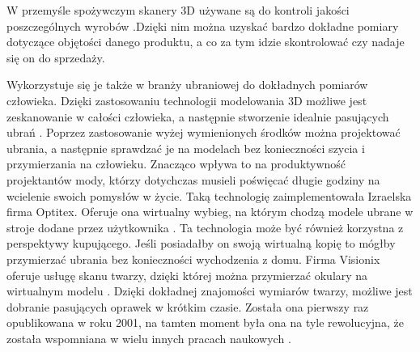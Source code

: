 \documentclass{pginz}
\begin{document}
W przemyśle spożywczym skanery 3D używane są do kontroli jakości poszczególnych wyrobów \cite{anders2012zastosowanie}.Dzięki nim można uzyskać bardzo dokładne pomiary dotyczące objętości danego produktu, a co za tym idzie skontrolować czy nadaje się on do sprzedaży.

Wykorzystuje się je także w branży ubraniowej do dokładnych pomiarów człowieka. Dzięki zastosowaniu technologii modelowania 3D możliwe jest zeskanowanie w całości człowieka, a następnie stworzenie idealnie pasujących ubrań \cite{d20073d}. Poprzez zastosowanie wyżej wymienionych środków można projektować ubrania, a następnie sprawdzać je na modelach bez konieczności szycia i przymierzania na człowieku. Znacząco wpływa to na produktywność projektantów mody, którzy dotychczas musieli poświęcać długie godziny na wcielenie swoich pomysłów w życie. Taką technologię zaimplementowała Izraelska firma Optitex. Oferuje ona wirtualny wybieg, na którym chodzą modele ubrane w stroje dodane przez użytkownika \cite{israelVirtualTryOn}.  
Ta technologia może być również korzystna z perspektywy kupującego. Jeśli posiadałby on swoją wirtualną kopię to mógłby przymierzać ubrania bez konieczności wychodzenia z domu. Firma Visionix oferuje usługę skanu twarzy, dzięki której można przymierzać okulary na wirtualnym modelu \cite{visionX}. Dzięki dokładnej znajomości wymiarów twarzy, możliwe jest dobranie pasujących oprawek w krótkim czasie. Została ona pierwszy raz opublikowana w roku 2001, na tamten moment była ona na tyle rewolucyjna, że została wspomniana w wielu innych pracach naukowych \cite{d20073d} \cite{d2006state}.




\renewcommand{\listtablename}{Spis tabel}
\renewcommand{\listfigurename}{Spis rysunków}
\listoffigures
\listoftables




\end{document}

